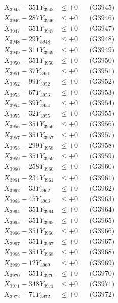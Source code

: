 \documentclass[a4paper,10pt]{article}
\begin{document}
{\begin{align}
X_{3945} - 351Y_{3945} &\leq +0 && \text{(G3945)} \\
X_{3946} - 287Y_{3946} &\leq +0 && \text{(G3946)} \\
X_{3947} - 351Y_{3947} &\leq +0 && \text{(G3947)} \\
X_{3948} - 29Y_{3948} &\leq +0 && \text{(G3948)} \\
X_{3949} - 311Y_{3949} &\leq +0 && \text{(G3949)} \\
X_{3950} - 351Y_{3950} &\leq +0 && \text{(G3950)} \\
\allowbreak
X_{3951} - 37Y_{3951} &\leq +0 && \text{(G3951)} \\
X_{3952} - 99Y_{3952} &\leq +0 && \text{(G3952)} \\
X_{3953} - 67Y_{3953} &\leq +0 && \text{(G3953)} \\
X_{3954} - 39Y_{3954} &\leq +0 && \text{(G3954)} \\
X_{3955} - 32Y_{3955} &\leq +0 && \text{(G3955)} \\
X_{3956} - 351Y_{3956} &\leq +0 && \text{(G3956)} \\
X_{3957} - 351Y_{3957} &\leq +0 && \text{(G3957)} \\
X_{3958} - 299Y_{3958} &\leq +0 && \text{(G3958)} \\
X_{3959} - 351Y_{3959} &\leq +0 && \text{(G3959)} \\
X_{3960} - 258Y_{3960} &\leq +0 && \text{(G3960)} \\
\allowbreak
X_{3961} - 234Y_{3961} &\leq +0 && \text{(G3961)} \\
X_{3962} - 33Y_{3962} &\leq +0 && \text{(G3962)} \\
X_{3963} - 45Y_{3963} &\leq +0 && \text{(G3963)} \\
X_{3964} - 351Y_{3964} &\leq +0 && \text{(G3964)} \\
X_{3965} - 351Y_{3965} &\leq +0 && \text{(G3965)} \\
X_{3966} - 351Y_{3966} &\leq +0 && \text{(G3966)} \\
X_{3967} - 351Y_{3967} &\leq +0 && \text{(G3967)} \\
X_{3968} - 351Y_{3968} &\leq +0 && \text{(G3968)} \\
X_{3969} - 12Y_{3969} &\leq +0 && \text{(G3969)} \\
X_{3970} - 351Y_{3970} &\leq +0 && \text{(G3970)} \\
\allowbreak
X_{3971} - 348Y_{3971} &\leq +0 && \text{(G3971)} \\
X_{3972} - 71Y_{3972} &\leq +0 && \text{(G3972)} \\

\end{align}}
\end{document}
